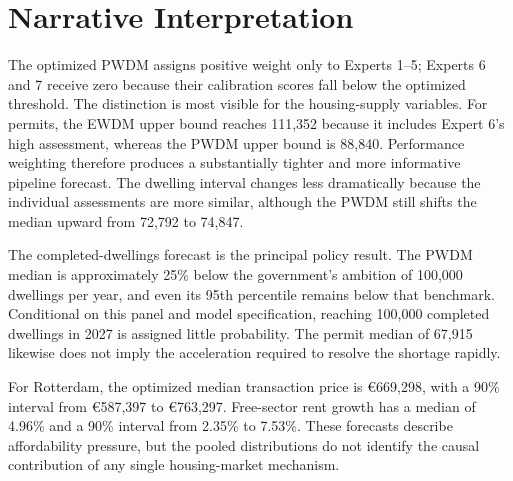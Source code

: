 \section{Narrative Interpretation}
\label{sec:narrative_interpretation}

The optimized PWDM assigns positive weight only to Experts 1--5; Experts 6 and 7 receive zero because their calibration scores fall below the optimized threshold. The distinction is most visible for the housing-supply variables. For permits, the EWDM upper bound reaches 111,352 because it includes Expert 6's high assessment, whereas the PWDM upper bound is 88,840. Performance weighting therefore produces a substantially tighter and more informative pipeline forecast. The dwelling interval changes less dramatically because the individual assessments are more similar, although the PWDM still shifts the median upward from 72,792 to 74,847.

The completed-dwellings forecast is the principal policy result. The PWDM median is approximately 25\% below the government's ambition of 100,000 dwellings per year, and even its 95th percentile remains below that benchmark. Conditional on this panel and model specification, reaching 100,000 completed dwellings in 2027 is assigned little probability. The permit median of 67,915 likewise does not imply the acceleration required to resolve the shortage rapidly.

For Rotterdam, the optimized median transaction price is \euro669,298, with a 90\% interval from \euro587,397 to \euro763,297. Free-sector rent growth has a median of 4.96\% and a 90\% interval from 2.35\% to 7.53\%. These forecasts describe affordability pressure, but the pooled distributions do not identify the causal contribution of any single housing-market mechanism.
